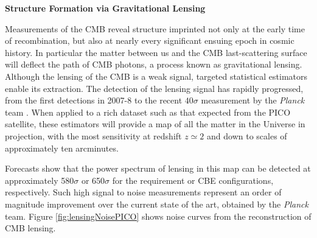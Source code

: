 \documentclass[PICOReport.tex]{subfiles}
\begin{document}
{\bf Structure Formation via Gravitational Lensing}


Measurements of the CMB reveal structure imprinted not only at the early time of recombination, but also at nearly every significant ensuing epoch in cosmic history.  In particular the matter between us and the CMB last-scattering surface will deflect the path of CMB photons, a process known as gravitational lensing.  Although the lensing of the CMB is a weak signal, targeted statistical estimators enable its  extraction.  
The detection of the lensing signal has rapidly progressed, from the first detections in 2007-8 \citep{2007PhRvD..76d3510S, 2008PhRvD..78d3520H} to the recent $ 40\sigma$ measurement by the {\it Planck} team \cite{2018arXiv180706210P}.  When applied to a rich dataset such as that expected from the PICO satellite, these estimators will provide a map of all the matter in the Universe in projection, with the most sensitivity at redshift $z \simeq 2$ and down to scales of approximately ten arcminutes.  

Forecasts show that the power spectrum of lensing in this map can be detected at approximately 580$\sigma$ or 650$\sigma$ for the requirement or CBE configurations, respectively.  Such high signal to noise measurements represent an order of magnitude improvement over the current state of the art, obtained by the  {\it Planck} team.  Figure \ref{fig:lensingNoisePICO} shows noise curves from the reconstruction of CMB lensing.  
\end{document}
